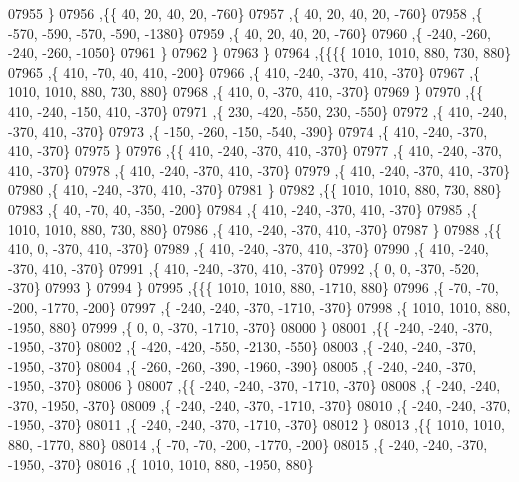 \begin{DoxyCode}
07955     \}
07956    ,\{\{    40,    20,    40,    20,  -760\}
07957     ,\{    40,    20,    40,    20,  -760\}
07958     ,\{  -570,  -590,  -570,  -590, -1380\}
07959     ,\{    40,    20,    40,    20,  -760\}
07960     ,\{  -240,  -260,  -240,  -260, -1050\}
07961     \}
07962    \}
07963   \}
07964  ,\{\{\{\{  1010,  1010,   880,   730,   880\}
07965     ,\{   410,   -70,    40,   410,  -200\}
07966     ,\{   410,  -240,  -370,   410,  -370\}
07967     ,\{  1010,  1010,   880,   730,   880\}
07968     ,\{   410,     0,  -370,   410,  -370\}
07969     \}
07970    ,\{\{   410,  -240,  -150,   410,  -370\}
07971     ,\{   230,  -420,  -550,   230,  -550\}
07972     ,\{   410,  -240,  -370,   410,  -370\}
07973     ,\{  -150,  -260,  -150,  -540,  -390\}
07974     ,\{   410,  -240,  -370,   410,  -370\}
07975     \}
07976    ,\{\{   410,  -240,  -370,   410,  -370\}
07977     ,\{   410,  -240,  -370,   410,  -370\}
07978     ,\{   410,  -240,  -370,   410,  -370\}
07979     ,\{   410,  -240,  -370,   410,  -370\}
07980     ,\{   410,  -240,  -370,   410,  -370\}
07981     \}
07982    ,\{\{  1010,  1010,   880,   730,   880\}
07983     ,\{    40,   -70,    40,  -350,  -200\}
07984     ,\{   410,  -240,  -370,   410,  -370\}
07985     ,\{  1010,  1010,   880,   730,   880\}
07986     ,\{   410,  -240,  -370,   410,  -370\}
07987     \}
07988    ,\{\{   410,     0,  -370,   410,  -370\}
07989     ,\{   410,  -240,  -370,   410,  -370\}
07990     ,\{   410,  -240,  -370,   410,  -370\}
07991     ,\{   410,  -240,  -370,   410,  -370\}
07992     ,\{     0,     0,  -370,  -520,  -370\}
07993     \}
07994    \}
07995   ,\{\{\{  1010,  1010,   880, -1710,   880\}
07996     ,\{   -70,   -70,  -200, -1770,  -200\}
07997     ,\{  -240,  -240,  -370, -1710,  -370\}
07998     ,\{  1010,  1010,   880, -1950,   880\}
07999     ,\{     0,     0,  -370, -1710,  -370\}
08000     \}
08001    ,\{\{  -240,  -240,  -370, -1950,  -370\}
08002     ,\{  -420,  -420,  -550, -2130,  -550\}
08003     ,\{  -240,  -240,  -370, -1950,  -370\}
08004     ,\{  -260,  -260,  -390, -1960,  -390\}
08005     ,\{  -240,  -240,  -370, -1950,  -370\}
08006     \}
08007    ,\{\{  -240,  -240,  -370, -1710,  -370\}
08008     ,\{  -240,  -240,  -370, -1950,  -370\}
08009     ,\{  -240,  -240,  -370, -1710,  -370\}
08010     ,\{  -240,  -240,  -370, -1950,  -370\}
08011     ,\{  -240,  -240,  -370, -1710,  -370\}
08012     \}
08013    ,\{\{  1010,  1010,   880, -1770,   880\}
08014     ,\{   -70,   -70,  -200, -1770,  -200\}
08015     ,\{  -240,  -240,  -370, -1950,  -370\}
08016     ,\{  1010,  1010,   880, -1950,   880\}

\end{DoxyCode}
